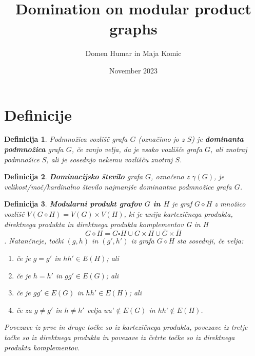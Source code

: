 \documentclass[a4paper,12pt]{article}
\newtheorem{definition}{Definicija}
\begin{document}
\author{Domen Humar in Maja Komic}
\date{November 2023}
\title{Domination on modular product graphs}
\maketitle

\section{Definicije}

    \begin{definition}
        Podmnožica vozlišč grafa $G$ (označimo jo z $S$) je \textbf{dominanta podmnožica}
        grafa $G$, če zanjo velja, da je vsako vozlišče grafa $G$, ali znotraj podmnožice $S$,
        ali je sosednjo nekemu vozlišču znotraj $S$.
    \end{definition}

    \begin{definition}
        \textbf{Dominacijsko število} grafa $G$, označeno z $\gamma(G)$, je velikost/moč/kardinalno število
        najmanjše \emph{dominantne podmnožice} grafa $G$.
    \end{definition}

    \begin{definition}
        \textbf {Modularni produkt grafov $G$ in $H$} je graf $G\diamond H$ z množico vozlišč $V( G\diamond H) = V(G) \times  V(H)$, ki je 
        unija kartezičnega produkta, direktnega produkta in direktnega produkta komplementov G in H
        $$G \diamond H = G\square H \cup G \times H \cup \overline{G} \times \overline{H} $$.
        Natančneje, točki $(g, h)$ in $(g', h')$ iz grafa $G \diamond H$ sta sosednji, če velja: 
        \begin{enumerate}
            \item če je $g = g'$ in $hh' \in E(H)$; ali 
            \item če je $h = h'$ in $gg' \in E(G)$; ali 
            \item če je $gg' \in E(G)$ in $hh' \in E(H)$; ali
            \item če za $g \neq g'$ in $h \neq h'$ velja $uu’ \notin  E(G)$ in $hh’ \notin  E(H)$. 
        \end{enumerate}
        Povezave iz prve in druge točke so iz kartezičnega produkta, povezave iz tretje točke so iz direktnega produkta
        in povezave iz četrte točke so iz direktnega produkta komplementov.
    \end{definition}
\end{document}
